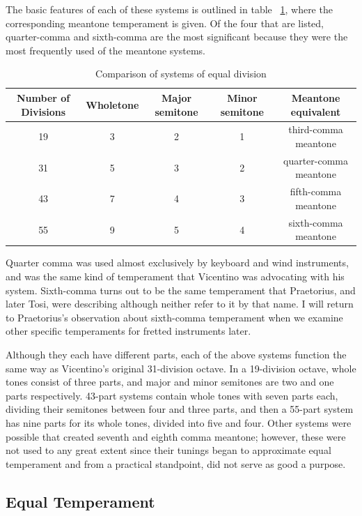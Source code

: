 The basic features of each of these systems is outlined in table
~\ref{table:equalDivision}, where the corresponding meantone temperament is given.  Of
the four that are listed, quarter-comma and sixth-comma are the most significant
because they were the most frequently used of the meantone systems.
\begin{table}[h!]
  \begin{center}
  \scalebox{0.7}
  {
    \begin{tabular}{ c c c c c}
      Number of Divisions & Wholetone & Major semitone & Minor semitone & Meantone equivalent \\
      \hline
      19 & 3 & 2 & 1 & third-comma meantone \\
      31 & 5 & 3 & 2 & quarter-comma meantone \\
      43 & 7 & 4 & 3 & fifth-comma meantone \\
      55 & 9 & 5 & 4 & sixth-comma meantone \\
    \end{tabular}
  }
  \end{center}
  \caption{Comparison of systems of equal division}
  \label{table:equalDivision}
\end{table}
Quarter comma was used almost exclusively by keyboard and wind instruments, and was the
same kind of temperament that Vicentino was advocating with his system. Sixth-comma turns
out to be the same temperament that Praetorius, and later Tosi, were describing although
neither refer to it by that name.  I will return to Praetorius's observation about
sixth-comma temperament when we examine other specific temperaments for fretted
instruments later.

Although they each have different parts, each of the above systems function the same way
as Vicentino's original 31-division octave. In a 19-division octave, whole tones consist
of three parts, and major and minor semitones are two and one parts respectively.  43-part
systems contain whole tones with seven parts each, dividing their semitones between four
and three parts, and then a 55-part system has nine parts for its whole tones, divided
into five and four.  Other systems were possible that created seventh and eighth comma
meantone; however, these were not used to any great extent since their tunings began to
approximate equal temperament and from a practical standpoint, did not serve as good a
purpose.

\subsection{Equal Temperament}

